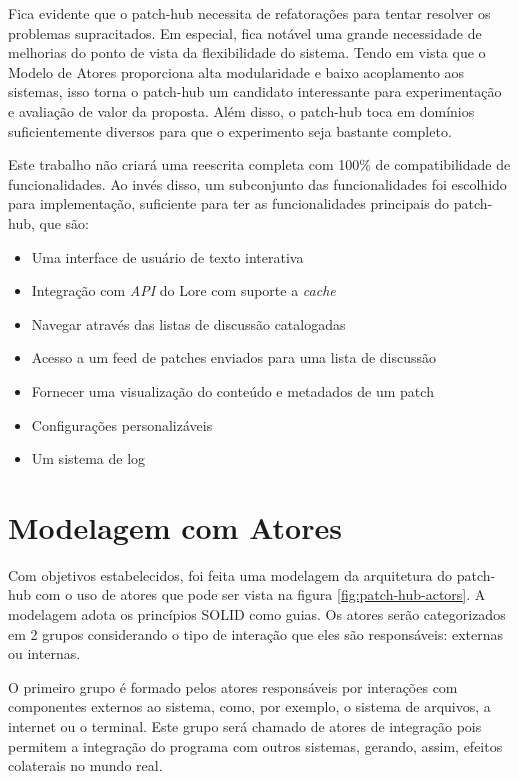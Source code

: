 Fica evidente que o patch-hub necessita de refatorações para tentar resolver os problemas supracitados. Em especial, fica notável uma grande necessidade de melhorias do ponto de vista da flexibilidade do sistema. Tendo em vista que o Modelo de Atores proporciona alta modularidade e baixo acoplamento aos sistemas, isso torna o patch-hub um candidato interessante para experimentação e avaliação de valor da proposta. Além disso, o patch-hub toca em domínios suficientemente diversos para que o experimento seja bastante completo.

Este trabalho não criará uma reescrita completa com 100\% de compatibilidade de funcionalidades. Ao invés disso, um subconjunto das funcionalidades foi escolhido para implementação, suficiente para ter as funcionalidades principais do patch-hub, que são:

\begin{itemize}
    \item Uma interface de usuário de texto interativa
    \item Integração com \emph{API} do Lore com suporte a \emph{cache}
    \item Navegar através das listas de discussão catalogadas
    \item Acesso a um feed de patches enviados para uma lista de discussão
    \item Fornecer uma visualização do conteúdo e metadados de um patch
    \item Configurações personalizáveis
    \item Um sistema de log
\end{itemize}

\section{Modelagem com Atores}

Com objetivos estabelecidos, foi feita uma modelagem da arquitetura do patch-hub com o uso de atores que pode ser vista na figura \ref{fig:patch-hub-actors}. A modelagem adota os princípios SOLID como guias. Os atores serão categorizados em 2 grupos considerando o tipo de interação que eles são responsáveis: externas ou internas.

O primeiro grupo é formado pelos atores responsáveis por interações com componentes externos ao sistema, como, por exemplo, o sistema de arquivos, a internet ou o terminal. Este grupo será chamado de atores de integração pois permitem a integração do programa com outros sistemas, gerando, assim, efeitos colaterais no mundo real.

